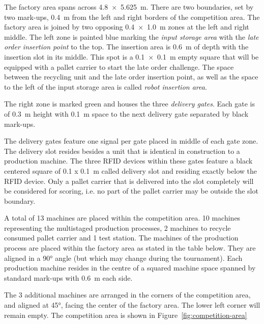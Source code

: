 \documentclass[12pt,twoside]{article}
\begin{document}
The factory area spans across \SI{4.8 x 5.625}{\metre}. There are two
boundaries, set by two mark-ups, \SI{0.4}{\metre} from the left and
right borders of the competition area. The factory area is joined by
two opposing \SI{0.4 x 1.0}{\metre} zones at the left and right
middle. The left zone is painted blue marking the \textit{input
  storage area} with the \textit{late order insertion point} to the
top. The insertion area is \SI{0.6}{\metre} of depth with the
insertion slot in its middle. This spot is a \SI{0.1 x 0.1}{\metre}
empty square that will be equipped with a pallet carrier to start the
late order challenge. The space between the recycling unit and the
late order insertion point, as well as the space to the left of the
input storage area is called \textit{robot insertion area}.

The right zone is marked green and houses the three \textit{delivery
  gates}.  Each gate is of \SI{0.3}{\metre} height with
\SI{0.1}{\metre} space to the next delivery gate separated by black
mark-ups.

The delivery gates feature one signal per gate placed in middle of
each gate zone. The delivery slot resides besides a unit that is
identical in construction to a production machine. The three RFID
devices within these gates feature a black centered square of \SI{0.1
  x 0.1}{\metre} called delivery slot and residing exactly below the
RFID device. Only a pallet carrier that is delivered into the slot
completely will be considered for scoring, i.e. no part of the pallet
carrier may be outside the slot boundary.

A total of 13 machines are placed within the competition area. 10
machines representing the multistaged production processes, 2 machines to
recycle consumed pallet carrier and 1 test station. The machines of
the production process are placed within the factory area as stated in
the table below. They are aligned in a \ang{90} angle (but which may
change during the tournament). Each production machine resides in the
centre of a squared machine space spanned by standard mark-ups with
\SI{0.6}{\metre} each side.

The 3 additional machines are arranged in the corners of the
competition area, and aligned at \ang{45}, facing the center of the
factory area. The lower left corner will remain empty. The competition
area is shown in Figure~\ref{fig:competition-area}
\end{document}
